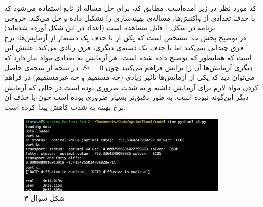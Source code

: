 کد مورد نظر در زیر آمده‌است. مطابق کد، برای حل مساله از تابع
استفاده می‌شود که با حذف تعدادی از واکنش‌ها، مساله‌ی بهینه‌سازی را تشکیل داده و حل می‌کند. خروجی برنامه در شکل
\ref{fig:q3}
قابل مشاهده است (اعداد در این شکل آورده شده‌اند).\\
در توضیح بخش ب: مشخص است که یکی از با حذف یک دسته‌از از آزمایش‌ها، نرخ فرق چندانی نمی‌کند اما با حذف یک دسته‌ی دیگری، فرق زیادی می‌کند. علتش این است که همانطور که توضیح داده شده است، هر آزمایش به تعدادی مواد نیاز دارد که دیگری آزمایش‌ها آن را برایش فراهم می‌کنند چون $Sv=0$. در نتیجه از نتیجه‌ی حاصل می‌توان دید که یکی از آزمایش‌ها تاثیر زیادی (چه مستقیم و چه غیرمستقیم) در فراهم کردن مواد لازم برای آزمایش  داشته و به شدت ضروری بوده است در حالی که‌ آزمایش دیگر این‌گونه نبوده است. به طور دقیق‌تر
بسیار ضروری بوده است چون با حذف آن نرخ بهینه به شدت کاهش پیدا کرده است.
\lstset{language=Python}
\begin{latin}

\end{latin}
\begin{figure}[H]
	\centering
	\includegraphics[width=0.9\textwidth]{q3}
	\caption{شکل سوال ۳}
	\label{fig:q3}
\end{figure}